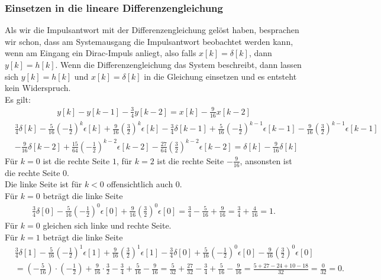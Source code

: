 \documentclass[11pt,a4paper,DIV=12]{scrartcl}
\begin{document}
\subsubsection*{Einsetzen in die lineare Differenzengleichung}
Als wir die Impulsantwort mit der Differenzengleichung gelöst haben, besprachen 
wir schon, dass am Systemausgang die Impulsantwort beobachtet werden kann, wenn 
am Eingang ein Dirac-Impuls anliegt, also falls $x[k]=\delta[k]$, dann 
$y[k]=h[k]$. 
%
Wenn die Differenzengleichung das System beschreibt, dann lassen sich 
$y[k]=h[k]$ und $x[k]=\delta[k]$ in die Gleichung einsetzen und es entsteht 
kein Widerspruch.\\
%
Es  gilt:
%
\begin{gather}
	y[k]-y[k-1]-\frac{3}{4}y[k-2]=x[k]-\frac{9}{16}x[k-2]
\end{gather}
%
%
%
\begin{align}
	&\frac{3}{4}\delta[k]-\frac{5}{16}\left(-\frac{1}{2}\right)^k\epsilon[k]+\frac{9}{16}\left(\frac{3}{2}\right)^k\epsilon[k]-\frac{3}{4}\delta[k-1]+\frac{5}{16}\left(-\frac{1}{2}\right)^{k-1}\epsilon[k-1]-\frac{9}{16}\left(\frac{3}{2}\right)^{k-1}\epsilon[k-1]\nonumber \\
	&-\frac{9}{16}\delta[k-2]+\frac{15}{64}\left(-\frac{1}{2}\right)^{k-2}\epsilon[k-2]-\frac{27}{64}\left(\frac{3}{2}\right)^{k-2}\epsilon[k-2]=\delta[k]-\frac{9}{16}\delta[k]
\end{align}
%
%
%
Für $k=0$ ist die rechte Seite $1$, für $k=2$ ist die rechte Seite 
$-\frac{9}{16}$, ansonsten ist die rechte Seite $0$.\\
%
Die linke Seite ist für $k<0$ offensichtlich auch 0.\\
%
Für $k=0$ beträgt die linke Seite
%
%
\begin{align}
	\frac{3}{4}\delta[0]-\frac{5}{16}\left(-\frac{1}{2}\right)^0\epsilon[0]+\frac{9}{16}\left(\frac{3}{2}\right)^0\epsilon[0]
	=\frac{3}{4}-\frac{5}{16}+\frac{9}{16}=\frac{3}{4}+\frac{4}{16}=1.
\end{align}
%
%
Für $k=0$ gleichen sich linke und rechte Seite.\\
%
Für $k=1$ beträgt die linke Seite
%
%
\begin{align}
	&\frac{3}{4}\delta[1]-\frac{5}{16}\left(-\frac{1}{2}\right)^1\epsilon[1]+\frac{9}{16}\left(\frac{3}{2}\right)^1\epsilon[1]-\frac{3}{4}\delta[0]+\frac{5}{16}\left(-\frac{1}{2}\right)^{0}\epsilon[0]-\frac{9}{16}\left(\frac{3}{2}\right)^{0}\epsilon[0]\nonumber\nonumber \\
	&=\left(-\frac{5}{16}\right)\cdot\left(-\frac{1}{2}\right)+\frac{9}{16}\cdot\frac{3}{2}-\frac{3}{4}+\frac{5}{16}-\frac{9}{16}=\frac{5}{32}+\frac{27}{32}-\frac{3}{4}+\frac{5}{16}-\frac{9}{16}=\frac{5+27-24+10-18}{32}=\frac{0}{32}=0.
\end{align}
\end{document}
